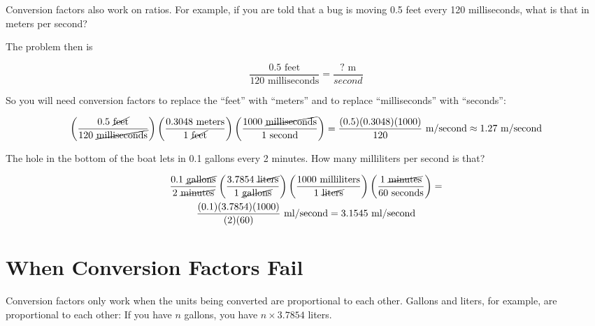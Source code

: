 Conversion factors also work on ratios. For example, if you are told
that a bug is moving 0.5 feet every 120 milliseconds, what is that in
meters per second?

The problem then is

$$\frac{0.5 \text{ feet}}{120 \text{ milliseconds}} = \frac{\text{? m}}{second}$$

So you will need conversion factors to replace the ``feet'' with ``meters'' and to replace ``milliseconds'' with ``seconds'':

\begin{multline*}
\left(\frac{0.5 \text{ \cancel{feet}}}{120 \text{ \cancel{milliseconds}}}\right) \left( \frac{0.3048 \text{ meters}}{1 \text{ \cancel{feet}}} \right) \left( \frac{ 1000 \text{ \cancel{milliseconds}}} {1 \text{ second}}\right) = \frac{(0.5)(0.3048)(1000)}{120}\text{ m/second} \approx 1.27 \text{ m/second}
\end{multline*}

\begin{Exercise}[title={Conversion Factors}, label=conversion_factors]

The hole in the bottom of the boat lets in 0.1 gallons every 2 minutes. How many milliliters per second is that?

\end{Exercise}
\begin{Answer}[ref=conversion_factors]

  \begin{multline*}
    \frac{0.1 \text{ \cancel{gallons}}}{2 \text{ \cancel{minutes}}}
  \left( \frac{3.7854 \text{ \cancel{liters}}}{1 \text{ \cancel{gallons}}} \right)
  \left( \frac{1000 \text{ milliliters}}{1\text{ \cancel{liters}}}\right)
  \left( \frac{1 \text{ \cancel{minutes}}}{60 \text{ seconds}} \right) = \\
  \frac{(0.1)(3.7854)(1000)}{(2)(60)} \text{ ml/second} = 3.1545 \text{ ml/second}
  \end{multline*}

\end{Answer}

\section{When Conversion Factors Fail}

Conversion factors only work when the units being converted are
proportional to each other. Gallons and liters, for example, are
proportional to each other: If you have $n$ gallons, you have $n
\times 3.7854$ liters.

